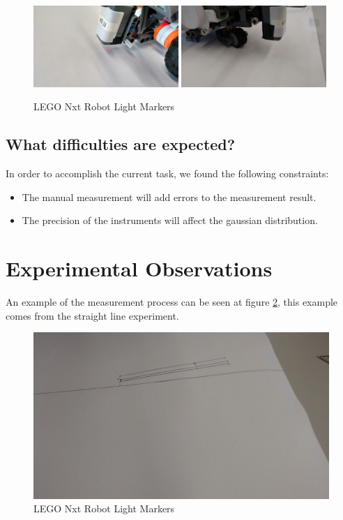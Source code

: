 \documentclass[10pt]{scrartcl}
\begin{document}
\begin{figure}[h!]
\centering
\caption{LEGO Nxt Robot Light Markers}
\label{fig:3}
\includegraphics[width=0.49\textwidth ]{images/marker_1}
\includegraphics[width=0.49\textwidth]{images/marker_2}
\end{figure}


\subsection*{What difficulties are expected?}

In order to accomplish the current task, we found the following constraints:

\begin{itemize}
	\item The manual measurement will add errors to the measurement result.
	\item The precision of the instruments will affect the gaussian distribution.
\end{itemize}

\section*{Experimental Observations}

An example of the measurement process can be seen at figure \ref{fig:4}, this example comes from the straight line experiment.

\begin{figure}[h!]
\centering
\caption{LEGO Nxt Robot Light Markers}
\label{fig:4}
\includegraphics[trim={200 400 300 50},clip,scale=0.4]{images/measurements}
\end{figure}
\end{document}
